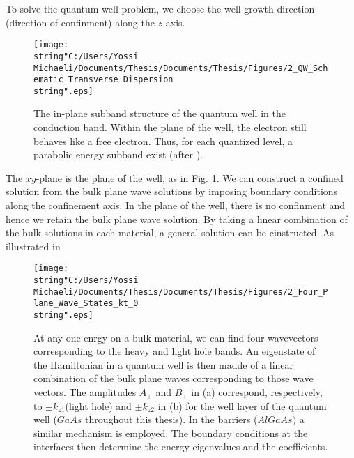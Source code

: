 To solve the quantum well problem, we choose the well growth direction
(direction of confinment) along the $z$-axis. %
\begin{figure}
\begin{centering}
\texttt{[image: \\string"C:/Users/Yossi Michaeli/Documents/Thesis/Documents/Thesis/Figures/2\_QW\_Schematic\_Transverse\_Dispersion\\string".eps]}
\par\end{centering}

\caption{\label{fig:QW_In_Plane_Dispersion}The \textquotedbl{}in-plane\textquotedbl{}
subband structure of the quantum well in the conduction band. Within
the plane of the well, the electron still behaves like a \textquotedbl{}free\textquotedbl{}
electron. Thus, for each quantized level, a parabolic energy subband
exist (after \citet{Zory1993}).}



\end{figure}
 The $xy$-plane is the plane of the well, as in Fig. \ref{fig:QW_In_Plane_Dispersion}.
We can construct a confined solution from the bulk plane wave solutions
by imposing boundary conditions along the confinement axis. In the
plane of the well, there is no confinment and hence we retain the
bulk plane wave solution. By taking a linear combination of the bulk
solutions in each material, a general solution can be cinstructed.
As illustrated in %
\begin{figure}
\begin{centering}
\texttt{[image: \\string"C:/Users/Yossi Michaeli/Documents/Thesis/Documents/Thesis/Figures/2\_Four\_Plane\_Wave\_States\_kt\_0\\string".eps]}
\par\end{centering}

\caption{\label{fig:Bulk_Dispersion_Coefficients}At any one enrgy on a bulk
material, we can find four wavevectors corresponding to the heavy
and light hole bands. An eigenstate of the Hamiltonian in a quantum
well is then madde of a linear combination of the bulk plane waves
corresponding to those wave vectors. The amplitudes $A_{\pm}$ and
$B_{\pm}$ in (a) correspond, respectively, to $\pm k_{z1}$(light
hole) and $\pm k_{z2}$ in (b) for the well layer of the quantum well
($GaAs$ throughout this thesis). In the barriers ($AlGaAs)$ a similar
mechanism is employed. The boundary conditions at the interfaces then
determine the energy eigenvalues and the coefficients.}

\end{figure}
